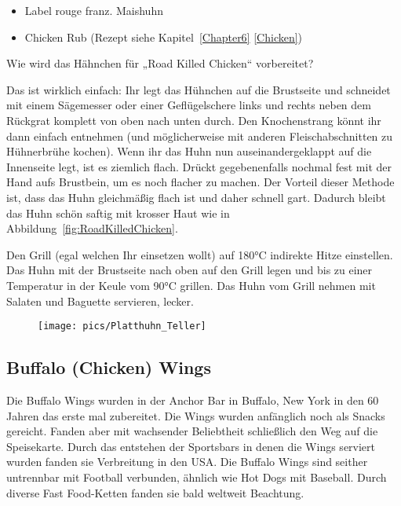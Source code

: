 \begin{itemize}[noitemsep]
	\item Label rouge franz. Maishuhn
	\item Chicken Rub (Rezept siehe Kapitel~\ref{Chapter6} \vref{Chicken})
\end{itemize}

Wie wird das Hähnchen für „Road Killed Chicken“ vorbereitet?

Das ist wirklich einfach: Ihr legt das Hühnchen auf die Brustseite und 
schneidet mit einem Sägemesser oder einer Geflügelschere links und 
rechts neben dem Rückgrat komplett von oben nach unten durch. Den 
Knochenstrang könnt ihr dann einfach entnehmen (und möglicherweise 
mit anderen Fleischabschnitten zu Hühnerbrühe kochen). Wenn ihr das 
Huhn nun auseinandergeklappt auf die Innenseite legt, ist es ziemlich 
flach. Drückt gegebenenfalls nochmal fest mit der Hand aufs Brustbein, 
um es noch flacher zu machen. Der Vorteil dieser Methode ist, dass das 
Huhn gleichmäßig flach ist und daher schnell gart. Dadurch bleibt das 
Huhn schön saftig mit krosser Haut wie in 
Abbildung~\vref{fig:RoadKilledChicken}.

Den Grill (egal welchen Ihr einsetzen wollt) auf 180°C indirekte Hitze 
einstellen.
Das Huhn mit der Brustseite nach oben auf den Grill legen und bis zu 
einer Temperatur in der Keule vom 90°C grillen. Das Huhn vom Grill 
nehmen mit Salaten und Baguette servieren, lecker.
\newpage

\begin{figure}[htbp]
	\centering
	\begin{minipage}{1\textwidth}
		\centering
		\texttt{[image: pics/Platthuhn\_Teller]}
		\label{fig:RoadKilledChicken}
	\end{minipage}
\end{figure}
\newpage

\subsection{Buffalo (Chicken) Wings}
Die Buffalo Wings wurden in der Anchor Bar in Buffalo, New York in den 60 Jahren das erste mal zubereitet. Die Wings wurden anfänglich 
noch als Snacks gereicht. Fanden aber mit wachsender Beliebtheit schließlich den Weg auf die Speisekarte. Durch das entstehen der 
Sportsbars in denen die Wings serviert wurden fanden sie Verbreitung in den USA. Die Buffalo Wings sind seither untrennbar mit Football 
verbunden, ähnlich wie Hot Dogs mit Baseball. Durch diverse Fast Food-Ketten fanden sie bald weltweit Beachtung.

